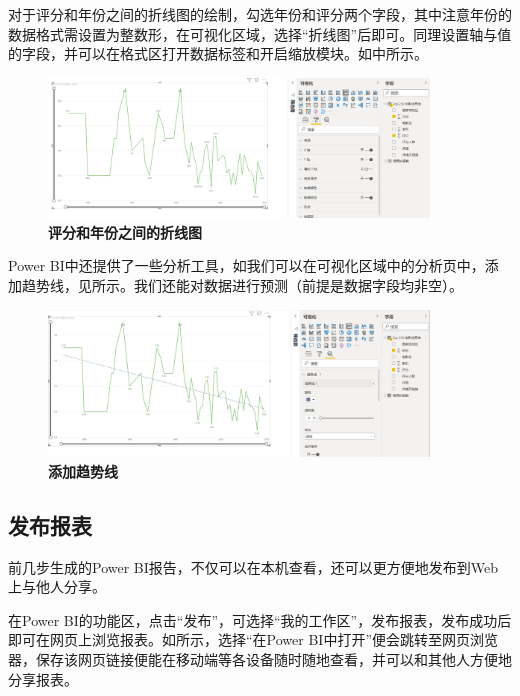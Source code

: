 对于评分和年份之间的折线图的绘制，勾选年份和评分两个字段，其中注意年份的数据格式需设置为整数形，在可视化区域，选择``折线图''后即可。同理设置轴与值的字段，并可以在格式区打开数据标签和开启缩放模块。如中所示。

\begin{figure}[htbp]
    \centering
    \includegraphics[width=0.9\textwidth]{figure/PowerBI/douban_score_year.png}
    \caption{\textbf{评分和年份之间的折线图}}
    \label{fig:douban_score_year}
\end{figure}

Power BI中还提供了一些分析工具，如我们可以在可视化区域中的分析页中，添加趋势线，见所示。我们还能对数据进行预测（前提是数据字段均非空）。

\begin{figure}[htbp]
    \centering
    \includegraphics[width=0.9\textwidth]{figure/PowerBI/douban_score_year_trend.png}
    \caption{\textbf{添加趋势线}}
    \label{fig:douban_score_year_trend}
\end{figure}

\subsection{发布报表}

前几步生成的Power BI报告，不仅可以在本机查看，还可以更方便地发布到Web上与他人分享。

在Power BI的功能区，点击``发布''，可选择``我的工作区''，发布报表，发布成功后即可在网页上浏览报表。如所示，选择``在Power BI中打开''便会跳转至网页浏览器，保存该网页链接便能在移动端等各设备随时随地查看，并可以和其他人方便地分享报表。

